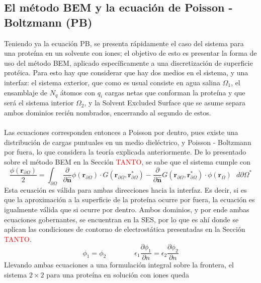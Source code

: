 \documentclass[12pt, oneside, numbers, spanish]{ezthesis}
\numberwithin{equation}{section}
\begin{document}
\subsection{El método BEM y la ecuación de Poisson - Boltzmann (PB)}
Teniendo ya la ecuación PB, se presenta rápidamente el caso del sistema para una proteína en un solvente con iones; el objetivo de esto es presentar la forma de uso del método BEM, aplicado específicamente a una discretización de superficie protéica. Para esto hay que considerar que hay dos medios en el sistema, y una interfaz: el sistema exterior, que como es usual consiste en agua salina $\Omega_1$, el ensamblaje de $N_q$ átomos con $q_i$ cargas netas que conforman la proteína y que será el sistema interior $\Omega_2$, y la Solvent Excluded Surface que se asume separa ambos dominios recién nombrados, encerrando al segundo de estos.\\\\
Las ecuaciones corresponden entonces a Poisson por dentro, pues existe una distribución de cargas puntuales en un medio dieléctrico, y Poisson - Boltzmann por fuera, lo que considera la teoría explicada anteriormente. De lo presentado sobre el método BEM en la Sección \textcolor{red}{TANTO}, se sabe que el sistema cumple con
\begin{equation}
\frac{\phi(\mathbf{r}_{\partial\Omega})}{2} = \int_{\partial\Omega}\frac{\partial}{\partial\hat{\mathbf{n}}}\phi(\mathbf{r}_{\partial\Omega})\cdot G(\mathbf{r}_{\partial\Omega},\mathbf{r}_{\partial\Omega}^*) - \frac{\partial}{\partial\hat{\mathbf{n}}}G(\mathbf{r}_{\partial\Omega},\mathbf{r}_{\partial\Omega}^*)\cdot\phi(\mathbf{r}_\Omega)\text{ }d\partial\Omega^*
\end{equation}
Esta ecuación es válida para ambas direcciones hacia la interfaz. Es decir, si es que la aproximación a la superficie de la proteína ocurre por fuera, la ecuación es igualmente válida que si ocurre por dentro. Ambos dominios, y por ende ambas ecuaciones gobernantes, se encuentran en la SES, por lo que es ahí donde se aplican las condiciones de contorno de electrostática presentadas en la Sección \textcolor{red}{TANTO}.
\begin{equation}
\phi_1 = \phi_2 \qquad\qquad \epsilon_1\frac{\partial\phi_1}{\partial n} = \epsilon_2\frac{\partial\phi_2}{\partial n}
\end{equation}
Llevando ambas ecuaciones a una formulación integral sobre la frontera, el sistema $2\times2$ para una proteína en solución con iones queda \cite{Cooper2015}
\end{document}
